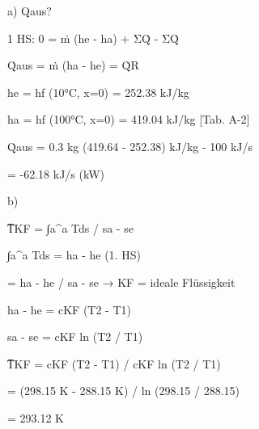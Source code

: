 a) Qaus?

1 HS: 0 = ṁ (he - ha) + ΣQ̇ - ΣQ̇

Q̇aus = ṁ (ha - he) = Q̇R

he = hf (10°C, x=0) = 252.38 kJ/kg

ha = hf (100°C, x=0) = 419.04 kJ/kg [Tab. A-2]

Q̇aus = 0.3 kg (419.64 - 252.38) kJ/kg - 100 kJ/s 

= -62.18 kJ/s (kW)

b)

T̅KF = ∫a^a Tds / sa - se

∫a^a Tds = ha - he (1. HS)

= ha - he / sa - se → KF = ideale Flüssigkeit

ha - he = cKF (T2 - T1)

sa - se = cKF ln (T2 / T1)

T̅KF = cKF (T2 - T1) / cKF ln (T2 / T1)

= (298.15 K - 288.15 K) / ln (298.15 / 288.15)

= 293.12 K